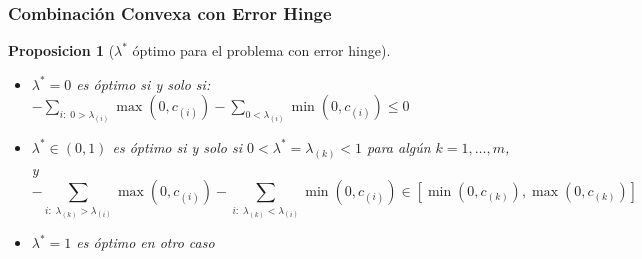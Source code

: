 \documentclass{beamer}
\newtheorem{proposition}[theorem]{Proposicion}
\newcommand{\mymax}[1]{\max\left(#1\right)}
\newcommand{\mymin}[1]{\min\left(#1\right)}
\newcommand{\npertask}{m}
\begin{document}
\begin{frame}
      \frametitle{Combinación Convexa con Error Hinge}
      \begin{proposition}[$\lambda^*$ óptimo para el problema con error hinge]\label{prop:hinge_neurocom2020}
            \begin{itemize}
                  \item $\lambda^*=0$ es óptimo si y solo si: $-\sum_{i:\; 0 > \lambda_{(i)}} \mymax{0, c_{(i)}} - \sum_{0 < \lambda_{(i)}} \mymin{0, c_{(i)}} \leq 0 $
                  \item $\lambda^* \in (0,1)$ es óptimo si y solo si $0 < \lambda^* = \lambda_{(k)} < 1$ para algún $k=1, \dotsc, \npertask$, y
                  \begin{equation}
                        \nonumber%
                        -\sum_{i:\; \lambda_{(k)} > \lambda_{(i)}} \mymax{0, c_{(i)}} - \sum_{i:\; \lambda_{(k)} <\lambda_{(i)}} \mymin{0, c_{(i)}} \in \left[\mymin{0, c_{(k)}}, \mymax{0, c_{(k)}} \right] 
                  \end{equation}
                  \item $\lambda^*=1$ es óptimo en otro caso
            \end{itemize}
        \end{proposition}
\end{frame}
\end{document}
